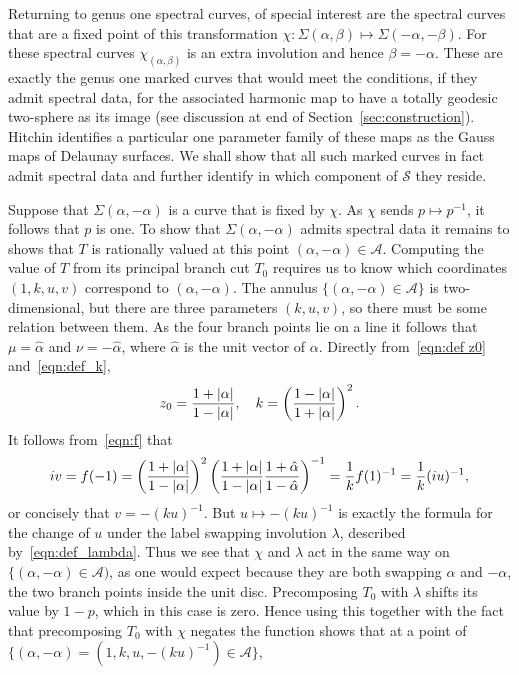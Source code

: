 \documentclass{article}
\begin{document}
Returning to genus one spectral curves, of special interest are the spectral curves that are a fixed point of this transformation $\chi: \Sigma(\alpha,\beta) \mapsto \Sigma(-\alpha,-\beta)$. For these spectral curves $\chi_{(\alpha,\beta)}$ is an extra involution and hence $\beta=-\alpha$. These are exactly the genus one marked curves that would meet the conditions, if they admit spectral data, for the associated harmonic map to have a totally geodesic two-sphere as its image (see discussion at end of Section~\ref{sec:construction}). Hitchin \cite[p693]{Hitchin1990} identifies a particular one parameter family of these maps as the Gauss maps of Delaunay surfaces. We shall show that all such marked curves in fact admit spectral data and further identify in which component of $\mathcal{S}$ they reside.

Suppose that $\Sigma(\alpha,-\alpha)$ is a curve that is fixed by $\chi$. As $\chi$ sends $p \mapsto p^{-1}$, it follows that $p$ is one. To show that $\Sigma(\alpha,-\alpha)$ admits spectral data it remains to shows that $T$ is rationally valued at this point $(\alpha,-\alpha) \in \mathcal{A}$.
Computing the value of $T$ from its principal branch cut $T_0$ requires us to know which coordinates $(1,k,u,v)$ correspond to $(\alpha,-\alpha)$.
The annulus $\{ (\alpha,-\alpha) \in \mathcal{A}\}$ is two-dimensional, but there are three parameters $(k,u,v)$, so there must be some relation between them. As the four branch points lie on a line it follows that $\mu=\hat{\alpha}$ and $\nu = -\hat{\alpha}$, where $\hat{\alpha}$ is the unit vector of $\alpha$. Directly from~\eqref{eqn:def z0} and~\eqref{eqn:def_k},
\[
z_0 = \frac{1+ \left|\alpha\right|}{1-\left|\alpha\right|},\quad
k = \left( \frac{1- \left|\alpha\right|}{1+\left|\alpha\right|} \right)^2.
\]
It follows from~\eqref{eqn:f} that
\[
i v = f(-1)
= \left(\frac{1+ \left|\alpha\right|}{1-\left|\alpha\right|}\right)^2 \left( \frac{1+ \left|\alpha\right|}{1-\left|\alpha\right|} \frac{1+\hat{\alpha}}{1-\hat{\alpha}}\right)^{-1}
= \frac{1}{k} f(1)^{-1}
= \frac{1}{k}(i u)^{-1},
\]
or concisely that $v= - (ku)^{-1}$. But $u \mapsto -(ku)^{-1}$ is exactly the formula for the change of $u$ under the label swapping involution $\lambda$, described by~\eqref{eqn:def_lambda}. Thus we see that $\chi$ and $\lambda$ act in the same way on $\{(\alpha,-\alpha) \in \mathcal{A})$, as one would expect because they are both swapping $\alpha$ and $-\alpha$, the two branch points inside the unit disc. Precomposing $T_0$ with $\lambda$ shifts its value by $1-p$, which in this case is zero. Hence using this together with the fact that precomposing $T_0$ with $\chi$ negates the function shows that at a point of $\{(\alpha,-\alpha) = (1,k,u,-(ku)^{-1})\in \mathcal{A}\}$,
\end{document}
